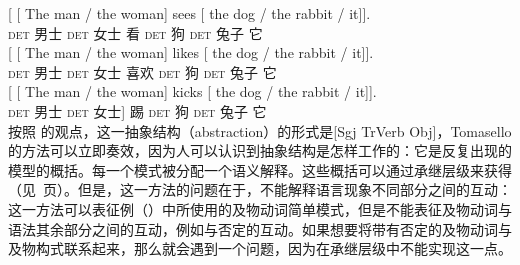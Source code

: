 \eal
\label{Beispiele-fuer-Transitivkonstruktion}
\ex
\gll  {}[ [ The man / the woman] sees  [ the dog / the rabbit / it]].\\
     {} {} \textsc{det} 男士 {} \textsc{det} 女士 看  {} \textsc{det} 狗 {} \textsc{det} 兔子 {} 它\\
\ex 
\gll  {}[ [ The man / the woman] likes [ the dog / the rabbit / it]].\\
     {} {} \textsc{det} 男士 {} \textsc{det} 女士 喜欢 {} \textsc{det} 狗 {} \textsc{det} 兔子 {} 它\\
\ex 
\gll  {}[ [ The man / the woman] kicks [ the dog / the rabbit / it]].\\
     {} {} \textsc{det} 男士 {} \textsc{det} 女士] 踢 {} \textsc{det} 狗 {} \textsc{det} 兔子 {} 它\\
\zl
按照 \citet[]{Tomasello2003a}的观点，这一抽象结构（abstraction）的形式是[Sgj TrVerb Obj]，Tomasello的方法可以立即奏效，因为人可以认识到抽象结构是怎样工作的：它是反复出现的模型的概括。每一个模式被分配一个语义解释。这些概括可以通过承继层级来获得（见~\pageref{Seite-Typhierarchie}页）\citep[]{Croft2001a}。但是，这一方法的问题在于，不能解释语言现象不同部分之间的互动：这一方法可以表征例（）中所使用的及物动词简单模式，但是不能表征及物动词与语法其余部分之间的互动，例如与否定的互动。如果想要将带有否定的及物动词与及物构式联系起来，那么就会遇到一个问题，因为在承继层级中不能实现这一点。
